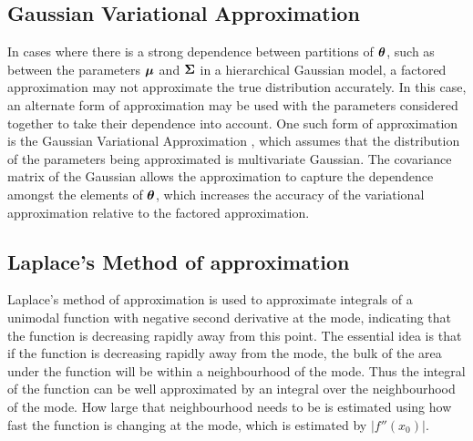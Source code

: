 
\subsection{Gaussian Variational Approximation}

In cases where there is a strong dependence between partitions of ${\boldsymbol \theta}$,  such as between the parameters
${\boldsymbol \mu}$ and ${\boldsymbol \Sigma}$ in a hierarchical Gaussian model, a factored approximation may not approximate the true
distribution accurately. In this case, an alternate form of approximation may be used with the parameters
considered together to take their dependence into account. One such form of approximation is the Gaussian
Variational Approximation \cite{Ormerod2012}, which assumes that the distribution of the parameters being
approximated is multivariate Gaussian. The covariance matrix of the Gaussian allows the approximation to
capture the dependence amongst the elements of ${\boldsymbol \theta}$, which increases the accuracy of the variational
approximation relative to the factored approximation.

\subsection{Laplace's Method of approximation}
\label{sec:laplace_approximation}

Laplace's method of approximation is used to approximate integrals of a unimodal function with negative second
derivative at the mode, indicating that the function is decreasing rapidly away from this point. The essential
idea is that if the function is decreasing rapidly away from the mode, the bulk of the area under the function
will be within a neighbourhood of the mode. Thus the integral of the function can be well approximated by an
integral over the neighbourhood of the mode. How large that neighbourhood needs to be is estimated using
how fast the function is changing at the mode, which is estimated by $|f''(x_0)|$.

